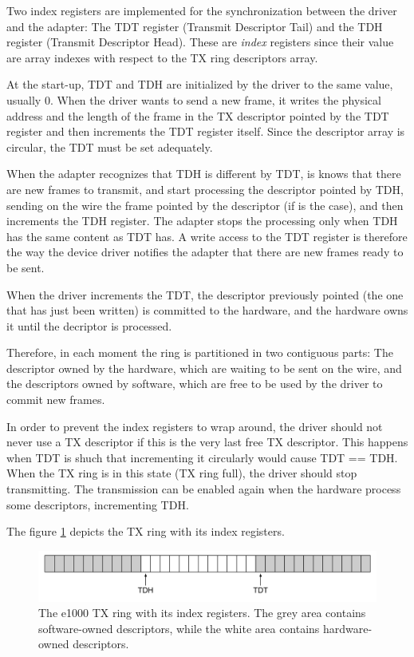 Two index registers are implemented for the synchronization between the driver and the adapter:
The TDT register (Transmit Descriptor Tail) and the TDH register (Transmit Descriptor Head). These are \emph{index} registers since
their value are array indexes with respect to the TX ring descriptors array.

At the start-up, TDT and TDH are initialized by the driver to the same value, usually 0. When the driver wants to send a new frame,
it writes the physical address and the length of the frame in the TX descriptor pointed by the TDT register and then increments the TDT
register itself. Since the descriptor array is circular, the TDT must be set adequately.

When the adapter recognizes that TDH is different by TDT, is knows that there are new frames to transmit, and start processing the
descriptor pointed by TDH, sending on the wire the frame pointed by the descriptor (if is the case), and then increments the TDH register.
The adapter stops the processing only when TDH has the same content as TDT has. A write access to the TDT register is therefore the
way the device driver notifies the adapter that there are new frames ready to be sent.

When the driver increments the TDT, the descriptor previously pointed (the one that has just been written) is committed to the hardware,
and the hardware owns it until the decriptor is processed.

Therefore, in each moment the ring is partitioned in two contiguous parts: The descriptor owned by the hardware, which are waiting
to be sent on the wire, and the descriptors owned by software, which are free to be used by the driver to commit new frames.

In order to prevent the index registers to wrap around, the driver should not never use a TX descriptor if this is the very last free
TX descriptor. This happens when TDT is shuch that incrementing it circularly would cause TDT == TDH. When the TX ring is in this
state (TX ring full), the driver should stop transmitting. The transmission can be enabled again when the hardware process some descriptors,
incrementing TDH.

The figure \ref{fig:txring} depicts the TX ring with its index registers.

\begin{figure}[bt]
\centering
\includegraphics[scale = 0.35]{tx-ring.pdf}
\caption{The e1000 TX ring with its index registers. The grey area contains software-owned descriptors, while the white area
	contains hardware-owned descriptors.}
\label{fig:txring}
\end{figure}


